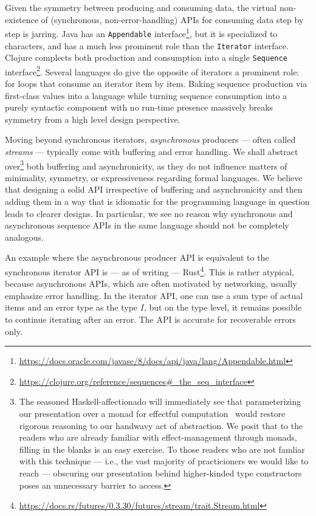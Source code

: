 \documentclass[sigplan,screen,10pt,anonymous,review]{acmart}
\begin{document}
Given the symmetry between producing and consuming data, the virtual non-existence of (synchronous, non-error-handling) APIs for consuming data step by step is jarring. Java has an \texttt{Appendable} interface\footnote{\url{https://docs.oracle.com/javase/8/docs/api/java/lang/Appendable.html}}, but it is specialized to characters, and has a much less prominent role than the \texttt{Iterator} interface. Clojure complects both production and consumption into a single \texttt{Sequence} interface\footnote{\url{https://clojure.org/reference/sequences\#_the_seq_interface}}. Several languages do give the opposite of iterators a prominent role: for loops that consume an iterator item by item. Baking sequence production via first-class values into a language while turning sequence consumption into a purely syntactic component with no run-time presence massively breaks symmetry from a high level design perspective.

Moving beyond synchronous iterators, \textit{asynchronous} producers --- often called \textit{streams} --- typically come with buffering and error handling. We shall abstract over\footnote{The seasoned Haskell-affectionado will immediately see that parameterizing our presentation over a monad for effectful computation~\cite{wadler1995monads} would restore rigorous reasoning to our handwavy act of abstraction. We posit that to the readers who are already familiar with effect-management through monads, filling in the blanks is an easy exercise. To those readers who are not famliar with this technique --- i.e., the vast majority of practicioners we would like to reach --- obscuring our presentation behind higher-kinded type constructors poses an unnecessary barrier to access.} both buffering and asynchronicity, as they do not influence matters of minimality, symmetry, or expressiveness regarding formal languages. We believe that designing a solid API irrespective of buffering and asynchronicity and then adding them in a way that is idiomatic for the programming language in question leads to clearer designs. In particular, we see no reason why synchronous and asynchronous sequence APIs in the same language should not be completely analogous.

An example where the asynchronous producer API is equivalent to the synchronous iterator API is --- as of writing --- Rust\footnote{\url{https://docs.rs/futures/0.3.30/futures/stream/trait.Stream.html}}. This is rather atypical, because asynchronous APIs, which are often motivated by networking, usually emphasize error handling. In the iterator API, one can use a sum type of actual items and an error type as the type $I$, but on the type level, it remains possible to continue iterating after an error. The API is accurate for recoverable errors only.
\end{document}
